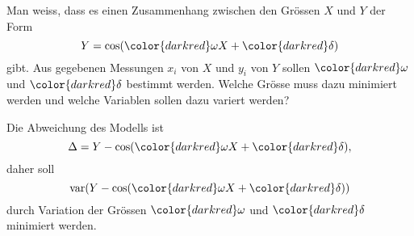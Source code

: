 Man weiss, dass es einen Zusammenhang zwischen den Grössen $X$ und $Y$
der Form
\[
Y = \cos ({\color{darkred}\omega} X + {\color{darkred}\delta} )
\]
gibt.
Aus gegebenen Messungen $x_i$ von $X$ und $y_i$ von $Y$ sollen
$\color{darkred}\omega$
und
$\color{darkred}\delta$
bestimmt werden.
Welche Grösse muss dazu minimiert werden und welche Variablen sollen dazu
variert werden?

\begin{loesung}
Die Abweichung des Modells ist
\[
\Delta
=
Y - \cos ( {\color{darkred}\omega} X + {\color{darkred}\delta} ),
\]
daher soll
\[
\operatorname{var}(
Y
-
\cos ( {\color{darkred}\omega} X + {\color{darkred}\delta} )
)
\]
durch Variation der Grössen
$\color{darkred}\omega$
und
$\color{darkred}\delta$
minimiert werden.
\end{loesung}

